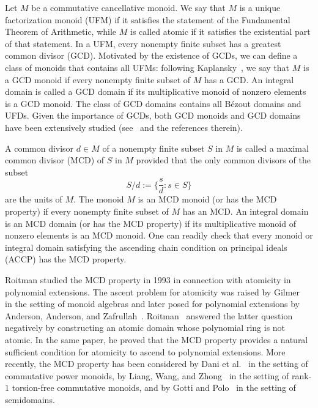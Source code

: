 \documentclass[10pt]{amsart}
\theoremstyle{definition}
\theoremstyle{remark}
\numberwithin{equation}{section}
\begin{document}
Let $M$ be a commutative cancellative monoid. We say that $M$ is a unique factorization monoid (UFM) if it satisfies the statement of the Fundamental Theorem of Arithmetic, while $M$ is called atomic if it satisfies the existential part of that statement. In a UFM, every nonempty finite subset has a greatest common divisor (GCD). Motivated by the existence of GCDs, we can define a class of monoids that contains all UFMs: following Kaplansky~\cite{iK70}, we say that $M$ is a GCD monoid if every nonempty finite subset of $M$ has a GCD. An integral domain is called a GCD domain if its multiplicative monoid of nonzero elements is a GCD monoid. The class of GCD domains contains all B\'ezout domains and UFDs. Given the importance of GCDs, both GCD monoids and GCD domains have been extensively studied (see~\cite{dA00,LP20} and the references therein).
\smallskip

A common divisor $d \in M$ of a nonempty finite subset $S$ in $M$ is called a maximal common divisor (MCD) of $S$ in $M$ provided that the only common divisors of the subset
\[
  S/d := \Big\{\frac{s}d : s \in S \Big\}
\]
are the units of $M$. The monoid $M$ is an MCD monoid (or has the MCD property) if every nonempty finite subset of $M$ has an MCD. An integral domain is an MCD domain (or has the MCD property) if its multiplicative monoid of nonzero elements is an MCD monoid. One can readily check that every monoid or integral domain satisfying the ascending chain condition on principal ideals (ACCP) has the MCD property.
\smallskip

Roitman studied the MCD property in 1993 in connection with atomicity in polynomial extensions. The ascent problem for atomicity was raised by Gilmer~\cite[page~189]{rG84} in the setting of monoid algebras and later posed for polynomial extensions by Anderson, Anderson, and Zafrullah~\cite[Question~2]{AAZ90}. Roitman~\cite{mR93} answered the latter question negatively by constructing an atomic domain whose polynomial ring is not atomic. In the same paper, he proved that the MCD property provides a natural sufficient condition for atomicity to ascend to polynomial extensions. More recently, the MCD property has been considered by Dani et al.~\cite{DGHLS25} in the setting of commutative power monoids, by Liang, Wang, and Zhong~\cite{LWZ24} in the setting of rank-$1$ torsion-free commutative monoids, and by Gotti and Polo~\cite{GP23} in the setting of semidomains.
\smallskip
\end{document}
